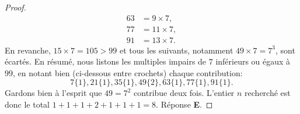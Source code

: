 \begin{proof}
%
\begin{align*} 
63 &= 9 \times 7, \\
77 &= 11 \times 7, \\
91 &= 13 \times 7.
\end{align*}
%
En revanche, $15 \times 7=105>99$ et tous les suivants, notamment $49 \times 7 = 7^3$, sont écartés. En résumé, nous listons %
les multiples impairs de $7$ inférieurs ou égaux à $99$, en notant bien (ci-dessous entre crochets) %
chaque contribution: 
%
\begin{equation}
7 \{1\}, 21 \{1\}, 35 \{1\}, 49 \{2\}, 63 \{1\}, 77 \{1\}, 91 \{1\}. 
\end{equation}
%
Gardons bien à l'esprit que $49 = 7^2$ contribue deux fois.
L'entier $n$ recherché est donc le total $1+1+1+2+1+1+1 = 8$. Réponse \textbf{E}.
\end{proof}